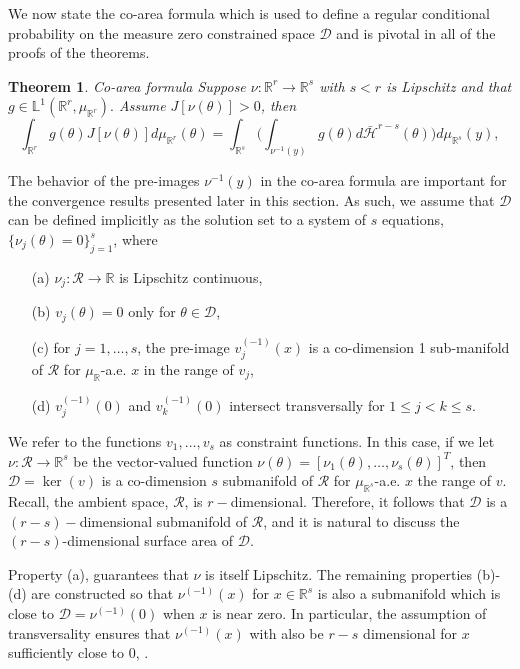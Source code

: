 \documentclass[10pt,fleqn]{article}
\newcommand{\leo}[1]{{\color{blue}{#1}}}
\newtheorem{theorem}{Theorem} \newtheorem{lemma}{Lemma}
\DeclareMathOperator{\1}{\mathbbm{1}} \DeclareMathOperator{\bigO}{\mc O}
\begin{document}
We now state the co-area formula which is used to define a regular
conditional probability on the measure zero constrained space $\mathcal{D}$
and is pivotal in all of the proofs of the theorems.
\begin{theorem}{Co-area formula \citep{diaconis2013manifold,
federer2014geometric}} Suppose $\nu:\mathbb{R}^r\to\mathbb{R}^s$
with $ s<r$ is Lipschitz and that
$g\in\mathbb{L}^1(\mathbb{R}^r,\mu_{\mathbb{R}^r}).$ Assume
$J[\nu(\theta)]>0$, then \begin{equation} \int_{\mathbb{R}^r}
g(\theta)J[\nu(\theta)]d\mu_{\mathbb{R}^r}( \theta)=
\int_{\mathbb{R}^s} \bigg( \int_{\nu^{-1}(y)}g(\theta)
d\bar{\mathcal{H}}^{r-s}(\theta)\bigg)d\mu_{\mathbb{R}^s}(y),
\end{equation} \end{theorem} The behavior of the pre-images
$\nu^{-1}(y)$ in the co-area formula are important for the
convergence results presented later in this section.  As such, we assume that $\mathcal{D}$ can be defined implicitly as the
solution set to a system of $s$ equations,  $\{\nu_j(\theta)=0\}_{j=1}^s$,
where \begin{itemize} \item[(a)] $\nu_j:\mathcal{R}\to\mathbb{R}$ is
Lipschitz continuous, \item[(b)] $v_j(\theta)=0$ only for
$\theta\in\mathcal{D}$, \item[(c)] for $j=1,\dots, s$, the
pre-image
$v_j^{(-1)}(x)$ is a co-dimension 1 sub-manifold of $\mathcal{R}$
for $\mu_\mathbb{R}$-a.e. $x$ in the range of $v_j$, \item[(d)]
$v_j^{(-1)}(0)$ and $v_k^{(-1)}(0)$ intersect transversally for
$1\le j<k\le s.$ \end{itemize}

We refer to the functions
$v_1,\dots,v_s$ as constraint functions. In this case, if we
let $\nu:\mathcal{R}\to \mathbb{R}^s$ be the vector-valued function
$\nu(\theta) = [\nu_1(\theta),\dots,\nu_s(\theta)]^T$, then
$\mathcal{D} = \ker(v)$ is a co-dimension $s$ submanifold of
$\mathcal{R}$ for $\mu_{\mathbb{R}^s}$-a.e. $x$ the range of $v.$
Recall, the ambient space, $\mathcal{R}$, is $r-$dimensional.
Therefore, it follows that $\mathcal{D}$ is a $(r-s)-$dimensional
submanifold of $\mathcal{R}$, and it is natural to discuss the
$(r-s)$-dimensional surface area of $\mathcal{D}.$

Property (a), guarantees that $\nu$ is itself Lipschitz.  The remaining
properties (b)-(d) are constructed so that $\nu^{(-1)}(x)$ for
$x\in\mathbb{R}^s$ is also a submanifold which is close to
$\mathcal{D}=\nu^{(-1)}(0)$ when $x$ is near zero.  In particular, the
assumption of transversality ensures that $\nu^{(-1)}(x)$ with also be
$r-s$ dimensional for $x$ sufficiently close to 0, \leo{defined by the
set $\mc X$}.
\end{document}
